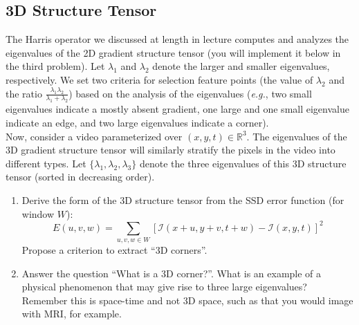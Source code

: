 \subsection{3D Structure Tensor}
The Harris operator we discussed at length in lecture computes and analyzes the eigenvalues of the 2D gradient structure tensor (you will implement it below in the third problem).
Let \(\lambda_1\) and \(\lambda_2\) denote the larger and smaller eigenvalues, respectively.
We set two criteria for selection feature points (the value of \(\lambda_2\) and the ratio \(\frac{\lambda_1\lambda_2}{\lambda_1+\lambda_2}\)) based on the analysis of the eigenvalues
(\textit{e.g.}, two small eigenvalues indicate a mostly absent gradient, one large and one small eigenvalue indicate an edge, and two large eigenvalues indicate a corner).\\
Now, consider a video parameterized over \((x,y,t)\in\mathbb{R}^3\).
The eigenvalues of the 3D gradient structure tensor will similarly stratify the pixels in the video into different types.
Let \(\{\lambda_1,\lambda_2,\lambda_3\}\) denote the three eigenvalues of this 3D structure tensor (sorted in decreasing order).
\begin{enumerate}
\item Derive the form of the 3D structure tensor from the SSD error function (for window \(W\)):
		\[ E(u,v,w)=\sum_{u,v,w\in W}\left[\mathcal{I}(x+u,y+v,t+w)-\mathcal{I}(x,y,t) \right]^2 \]
		Propose a criterion to extract ``3D corners''.
\item Answer the question ``What is a 3D corner?''.
		What is an example of a physical phenomenon that may give rise to three large eigenvalues?
		Remember this is space-time and not 3D space, such as that you would image with MRI, for example.
\end{enumerate}



